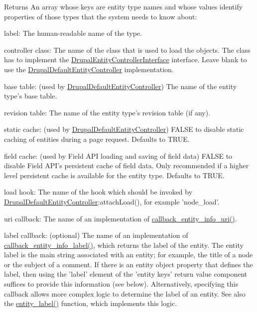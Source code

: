 \begin{DoxyReturn}{Returns}
An array whose keys are entity type names and whose values identify properties of those types that the system needs to know about:
\begin{DoxyItemize}
\item label: The human-\/readable name of the type.
\item controller class: The name of the class that is used to load the objects. The class has to implement the \hyperlink{interfaceDrupalEntityControllerInterface}{DrupalEntityControllerInterface} interface. Leave blank to use the \hyperlink{classDrupalDefaultEntityController}{DrupalDefaultEntityController} implementation.
\item base table: (used by \hyperlink{classDrupalDefaultEntityController}{DrupalDefaultEntityController}) The name of the entity type's base table.
\item revision table: The name of the entity type's revision table (if any).
\item static cache: (used by \hyperlink{classDrupalDefaultEntityController}{DrupalDefaultEntityController}) FALSE to disable static caching of entities during a page request. Defaults to TRUE.
\item field cache: (used by Field API loading and saving of field data) FALSE to disable Field API's persistent cache of field data. Only recommended if a higher level persistent cache is available for the entity type. Defaults to TRUE.
\item load hook: The name of the hook which should be invoked by \hyperlink{classDrupalDefaultEntityController}{DrupalDefaultEntityController}:attachLoad(), for example 'node\_\-load'.
\item uri callback: The name of an implementation of \hyperlink{group__callbacks_ga42bf4e69ee32b2bc99d0d774d4917254}{callback\_\-entity\_\-info\_\-uri()}.
\item label callback: (optional) The name of an implementation of \hyperlink{group__callbacks_gae9464157712e8322955f45a671a8403d}{callback\_\-entity\_\-info\_\-label()}, which returns the label of the entity. The entity label is the main string associated with an entity; for example, the title of a node or the subject of a comment. If there is an entity object property that defines the label, then using the 'label' element of the 'entity keys' return value component suffices to provide this information (see below). Alternatively, specifying this callback allows more complex logic to determine the label of an entity. See also the \hyperlink{common_8inc_aa9868513964b440f8206571573b833b3}{entity\_\-label()} function, which implements this logic.

\end{DoxyItemize}
\end{DoxyReturn}
